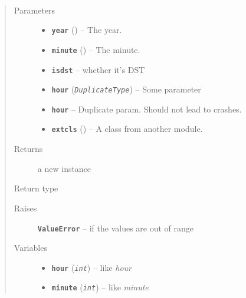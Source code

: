 \documentclass[letterpaper,10pt,english]{sphinxhowto}
\begin{document}
\begin{fulllineitems}
\label{objects:Time}~\begin{quote}\begin{description}
\item[{Parameters}] \leavevmode\begin{itemize}
\item {} 
\textbf{\texttt{year}} ({\hyperref[objects:TimeInt]{}}) -- The year.

\item {} 
\textbf{\texttt{minute}} ({\hyperref[objects:TimeInt]{}}) -- The minute.

\item {} 
\textbf{\texttt{isdst}} -- whether it's DST

\item {} 
\textbf{\texttt{hour}} (\emph{\texttt{DuplicateType}}) -- Some parameter

\item {} 
\textbf{\texttt{hour}} -- Duplicate param.  Should not lead to crashes.

\item {} 
\textbf{\texttt{extcls}} ({\hyperref[objects:mod.Cls]{}}) -- A class from another module.

\end{itemize}

\item[{Returns}] \leavevmode
a new {\hyperref[objects:Time]{}} instance

\item[{Return type}] \leavevmode
{\hyperref[objects:Time]{}}

\item[{Raises}] \leavevmode
\textbf{\texttt{ValueError}} -- if the values are out of range

\item[{Variables}] \leavevmode\begin{itemize}
\item {} 
\textbf{\texttt{hour}} (\emph{\texttt{int}}) -- like \emph{hour}

\item {} 
\textbf{\texttt{minute}} (\emph{\texttt{int}}) -- like \emph{minute}

\end{itemize}

\end{description}\end{quote}

\end{fulllineitems}
\end{document}
